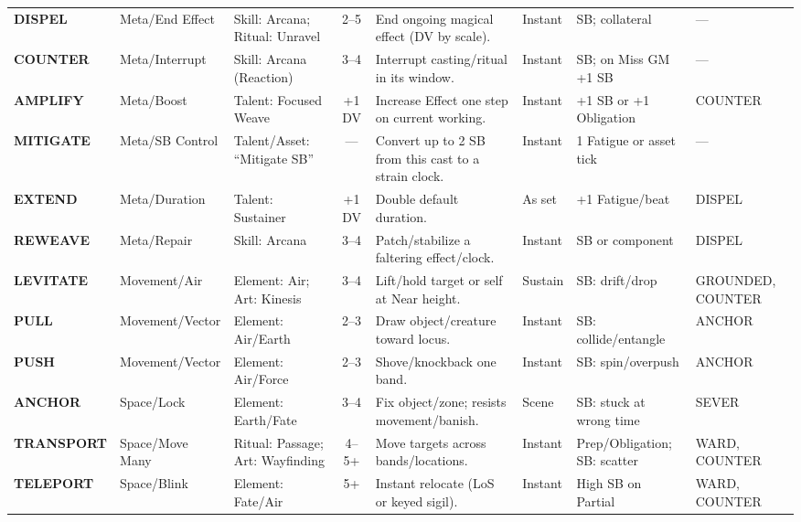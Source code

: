 \begin{longtable}{@{} l l p{4.2cm} c p{6.5cm} p{2.2cm} p{3.2cm} p{2.2cm} @{}}
\textbf{DISPEL}    & Meta/End Effect   & Skill: Arcana; Ritual: Unravel       & 2--5 & End ongoing magical effect (DV by scale). & Instant & SB; collateral & — \\
\textbf{COUNTER}   & Meta/Interrupt    & Skill: Arcana (Reaction)             & 3--4 & Interrupt casting/ritual in its window. & Instant & SB; on Miss GM +1 SB & — \\
\textbf{AMPLIFY}   & Meta/Boost        & Talent: Focused Weave                & +1 DV & Increase Effect one step on current working. & Instant & +1 SB or +1 Obligation & COUNTER \\
\textbf{MITIGATE}  & Meta/SB Control   & Talent/Asset: “Mitigate SB”          & —     & Convert up to 2 SB from this cast to a strain clock. & Instant & 1 Fatigue or asset tick & — \\
\textbf{EXTEND}    & Meta/Duration     & Talent: Sustainer                     & +1 DV & Double default duration. & As set & +1 Fatigue/beat & DISPEL \\
\textbf{REWEAVE}   & Meta/Repair       & Skill: Arcana                         & 3--4 & Patch/stabilize a faltering effect/clock. & Instant & SB or component & DISPEL \\

\textbf{LEVITATE}  & Movement/Air      & Element: Air; Art: Kinesis           & 3--4 & Lift/hold target or self at Near height. & Sustain & SB: drift/drop & GROUNDED, COUNTER \\
\textbf{PULL}      & Movement/Vector   & Element: Air/Earth                   & 2--3 & Draw object/creature toward locus. & Instant & SB: collide/entangle & ANCHOR \\
\textbf{PUSH}      & Movement/Vector   & Element: Air/Force                   & 2--3 & Shove/knockback one band. & Instant & SB: spin/overpush & ANCHOR \\
\textbf{ANCHOR}    & Space/Lock        & Element: Earth/Fate                  & 3--4 & Fix object/zone; resists movement/banish. & Scene & SB: stuck at wrong time & SEVER \\
\textbf{TRANSPORT} & Space/Move Many   & Ritual: Passage; Art: Wayfinding     & 4--5+ & Move targets across bands/locations. & Instant & Prep/Obligation; SB: scatter & WARD, COUNTER \\
\textbf{TELEPORT}  & Space/Blink       & Element: Fate/Air                    & 5+    & Instant relocate (LoS or keyed sigil). & Instant & High SB on Partial & WARD, COUNTER \\


\end{longtable}
